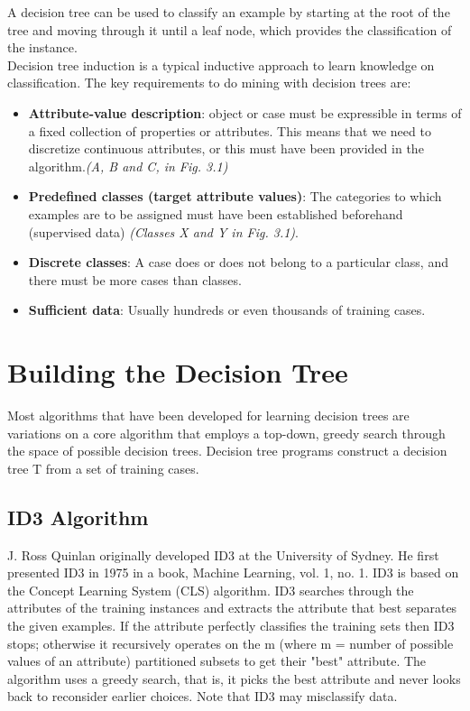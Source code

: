 \documentclass[12pt]{report}
\begin{document}
A decision tree can be used to classify an example by starting at the root of the tree and moving through it until a leaf node, which provides the classification of the instance.\\

Decision tree induction is a typical inductive approach to learn knowledge on classification. The key requirements to do mining with decision trees are:
\begin{itemize}
\item{\textbf{Attribute-value description}: object or case must be expressible in terms of a fixed collection of properties or attributes. This means that we need to discretize continuous attributes, or this must have been provided in the algorithm.\textit{(A, B and C, in Fig. 3.1)}}
\item{\textbf{Predefined classes (target attribute values)}: The categories to which examples are to be assigned must have been established beforehand (supervised data) \textit{(Classes X and Y in Fig. 3.1)}.}
\item{\textbf{Discrete classes}: A case does or does not belong to a particular class, and there must be more cases than classes.}
\item{\textbf{Sufficient data}: Usually hundreds or even thousands of training cases.}

\end{itemize}



\section{Building the Decision Tree}

Most algorithms that have been developed for learning decision trees are variations on a core algorithm that employs a top-down, greedy search through the space of possible decision trees. Decision tree programs construct a decision tree T from a set of training cases.


\subsection{ID3 Algorithm}
J. Ross Quinlan originally developed ID3 at the University of Sydney. He first presented ID3 in 1975 in a book, Machine Learning, vol. 1, no. 1. ID3 is based on the Concept Learning System (CLS) algorithm. ID3 searches through the attributes of the training instances and extracts the attribute that best separates the given examples. If the attribute perfectly classifies the training sets then ID3 stops; otherwise it recursively operates on the m (where m = number of possible values of an attribute) partitioned subsets to get their "best" attribute. The algorithm uses a greedy search, that is, it picks the best attribute and never looks back to reconsider earlier choices. Note that ID3 may misclassify data. 
\end{document}
